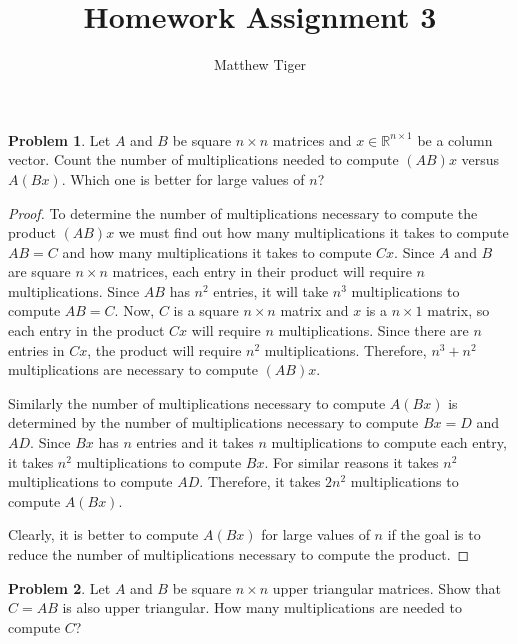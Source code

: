 \documentclass[12pt]{article}
\title{Homework Assignment 3}
\author{Matthew Tiger}
\theoremstyle{definition}
\newtheorem{problem}{Problem}
\begin{document}
\maketitle


\begin{problem}
  Let $A$ and $B$ be square $n \times n$ matrices and $x \in \mathbb{R}^{n \times 1}$ be
  a column vector. Count the number of multiplications needed to compute
  $(AB)x$ versus $A(Bx)$. Which one is better for large values of $n$?
\end{problem}

\begin{proof}
  To determine the number of multiplications necessary to compute the product
  $(AB)x$ we must find out how many multiplications it takes
  to compute $AB = C$ and how many multiplications it takes to compute $Cx$.
  Since $A$ and $B$ are square $n \times n$ matrices, each entry in their product
  will require $n$ multiplications. Since $AB$ has $n^2$ entries, it will take
  $n^3$ multiplications to compute $AB=C$. Now, $C$ is a square $n \times n$
  matrix and $x$ is a $n \times 1$ matrix, so each entry in the product $Cx$ will
  require $n$ multiplications. Since there are $n$ entries in $Cx$, the product
  will require $n^2$ multiplications. Therefore, $n^3 + n^2$ multiplications
  are necessary to compute $(AB)x$.

  Similarly the number of multiplications necessary to compute $A(Bx)$ is
  determined by the number of multiplications necessary to compute $Bx =D$
  and $AD$. Since $Bx$ has $n$ entries and it takes $n$ multiplications to
  compute each entry, it takes $n^2$ multiplications to compute $Bx$. For similar
  reasons it takes $n^2$ multiplications to compute $AD$. Therefore,
  it takes $2n^2$ multiplications to compute $A(Bx)$.

  Clearly, it is better to compute $A(Bx)$ for large values of $n$ if the goal
  is to reduce the number of multiplications necessary to compute the product.
\end{proof}


\begin{problem}
  Let $A$ and $B$ be square $n \times n$ upper triangular matrices. Show that $C=AB$
  is also upper triangular. How many multiplications are needed to compute
  $C$?
\end{problem}
\end{document}
